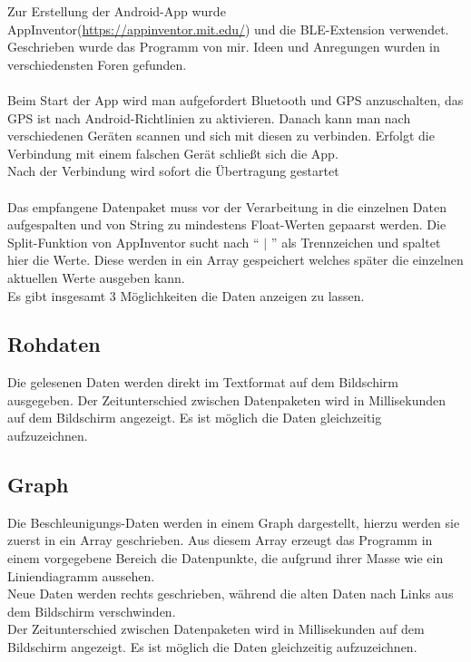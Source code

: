 Zur Erstellung der Android-App wurde AppInventor(\url{https://appinventor.mit.edu/}) und 
die BLE-Extension verwendet.\\
Geschrieben wurde das Programm von mir. Ideen und Anregungen wurden in verschiedensten 
Foren gefunden. \\
\\
Beim Start der App wird man aufgefordert Bluetooth und GPS anzuschalten, das GPS
ist nach Android-Richtlinien zu aktivieren. Danach kann man nach verschiedenen
Geräten scannen und sich mit diesen zu verbinden. Erfolgt die Verbindung mit einem
falschen Gerät schließt sich die App.\\
Nach der Verbindung wird sofort die Übertragung gestartet\\
\\
Das empfangene Datenpaket muss vor der Verarbeitung in die einzelnen Daten
aufgespalten und von String zu mindestens Float-Werten gepaarst werden.
Die Split-Funktion von AppInventor sucht nach `` $|$ '' als Trennzeichen und spaltet
hier die Werte. Diese werden in ein Array gespeichert welches später
die einzelnen aktuellen Werte ausgeben kann.\\
Es gibt insgesamt 3 Möglichkeiten die Daten anzeigen zu lassen.

\subsection{Rohdaten}
Die gelesenen Daten werden direkt im Textformat auf dem Bildschirm ausgegeben.
Der Zeitunterschied zwischen Datenpaketen wird in Millisekunden auf dem Bildschirm
angezeigt.
Es ist möglich die Daten gleichzeitig aufzuzeichnen.

\subsection{Graph}
Die Beschleunigungs-Daten werden in einem Graph dargestellt, hierzu werden sie zuerst in ein
Array geschrieben. Aus diesem Array erzeugt das Programm in einem vorgegebene Bereich
die Datenpunkte, die aufgrund ihrer Masse wie ein Liniendiagramm aussehen.\\
Neue Daten werden rechts geschrieben, während die alten Daten nach Links aus dem
Bildschirm verschwinden.\\
Der Zeitunterschied zwischen Datenpaketen wird in Millisekunden auf dem Bildschirm
angezeigt.
Es ist möglich die Daten gleichzeitig aufzuzeichnen.\\

